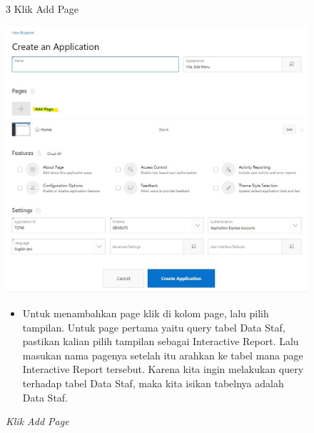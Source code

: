 \begin{itemize}
        \begin{figure}[!htbp]
        \item[3]Klik Add Page
        \begin{center}
        \includegraphics[scale=0.4]{figures/klik_add_page.jpg}
        \caption{\textit{Klik Add Page}}
        \end{center}
        \begin{itemize}
            \item Untuk menambahkan page klik di kolom page, lalu pilih tampilan. Untuk page pertama yaitu query tabel Data Staf, pastikan kalian pilih tampilan sebagai Interactive Report. Lalu masukan nama pagenya setelah itu arahkan ke tabel mana page Interactive Report tersebut. Karena kita ingin melakukan query terhadap tabel Data Staf, maka kita isikan tabelnya adalah Data Staf. 
        \end{itemize}
        \end{figure}
        

\end{itemize}
